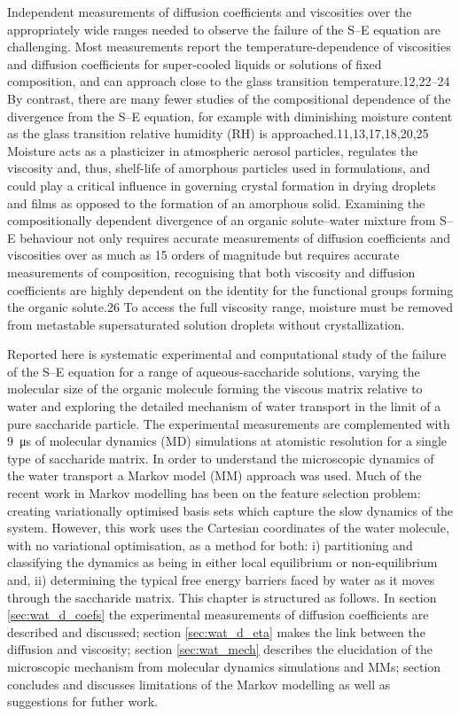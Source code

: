 Independent measurements of diffusion coefficients and viscosities over the appropriately wide ranges needed to observe the failure of the S–E equation are challenging. Most measurements report the temperature-dependence of viscosities and diffusion coefficients for super-cooled liquids or solutions of fixed composition, and can approach close to the glass transition temperature.12,22–24 By contrast, there are many fewer studies of the compositional dependence of the divergence from the S–E equation, for example with diminishing moisture content as the glass transition relative humidity (RH) is approached.11,13,17,18,20,25 Moisture acts as a plasticizer in atmospheric aerosol particles, regulates the viscosity and, thus, shelf-life of amorphous particles used in formulations, and could play a critical influence in governing crystal formation in drying droplets and films as opposed to the formation of an amorphous solid. Examining the compositionally dependent divergence of an organic solute–water mixture from S–E behaviour not only requires accurate measurements of diffusion coefficients and viscosities over as much as 15 orders of magnitude but requires accurate measurements of composition, recognising that both viscosity and diffusion coefficients are highly dependent on the identity for the functional groups forming the organic solute.26 To access the full viscosity range, moisture must be removed from metastable supersaturated solution droplets without crystallization. 

Reported here is systematic experimental and computational study of the failure of the S–E equation for a range of aqueous-saccharide solutions, varying the molecular size of the organic molecule forming the viscous matrix relative to water and exploring the detailed mechanism of water transport in the limit of a pure saccharide particle. The experimental measurements are complemented with \SI{9}{\micro\second} of molecular dynamics (MD) simulations at atomistic resolution for a single type of saccharide matrix.  In order to understand the microscopic dynamics of the water transport a Markov model (MM) approach was used. Much of the recent work \cite{schererVariationalSelectionFeatures2019}\cite{husicMarkovStateModels2018} in Markov modelling has been on the feature selection problem: creating variationally optimised basis sets which capture the slow dynamics of the system. However, this work uses the Cartesian coordinates of the water molecule, with no variational optimisation, as a method for both: i) partitioning and classifying the dynamics as being in either local equilibrium or non-equilibrium and, ii) determining the typical free energy barriers faced by water as it moves through the saccharide matrix. This chapter is structured as follows. In section \ref{sec:wat_d_coefs} the experimental measurements of diffusion coefficients are described and discussed; section \ref{sec:wat_d_eta} makes the link  between the diffusion and viscosity; section \ref{sec:wat_mech} describes the elucidation of the microscopic mechanism from molecular dynamics simulations and MMs; section \label{sec:wat_conclusions} concludes and discusses limitations of the Markov modelling as well as suggestions for futher work. 

